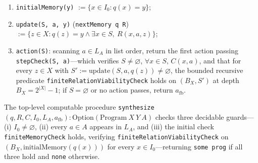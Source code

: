 \documentclass[11pt,a4paper]{article}
\newcounter{none}
\providecommand{\tightlist}{\setlength{\itemsep}{2pt}\setlength{\parskip}{0pt}}
\begin{document}
\begin{enumerate}
\def\labelenumi{\arabic{enumi}.}
\tightlist
\item
  \texttt{initialMemory(y)} \(:= \{x \in I_0 : q(x) = y\}\);
\item
  \texttt{update(S,\ a,\ y)} (\texttt{nextMemory\ q\ R})
  \(:= \{z \in X : q(z) = y \land \exists x \in S,\ R(x,a,z)\}\);
\item
  \texttt{action(S)}: scanning \(a \in L_A\) in list order, return the
  first action passing \texttt{stepCheck(S,\ a)}---which verifies
  \(S \neq \varnothing\), \(\forall x \in S,\, C(x,a)\), and that for
  every \(z \in X\) with
  \(S' := \mathrm{update}(S, a, q(z)) \neq \varnothing\), the bounded
  recursive predicate \texttt{finiteRelationViabilityCheck} holds on
  \((B_X, S')\) at depth \(B_X = 2^{|X|} - 1\); if \(S = \varnothing\)
  or no action passes, return \(a_{\mathrm{fb}}\).
\end{enumerate}

The top-level computable procedure
\texttt{synthesize}\((q, R, C, I_0, L_A, a_{\mathrm{fb}}) : \mathrm{Option}(\mathrm{Program}\ X\ Y\ A)\)
checks three decidable guards---(i) \(I_0 \neq \varnothing\), (ii) every
\(a \in A\) appears in \(L_A\), and (iii) the initial check
\texttt{finiteMemoryCheck} holds, verifying
\texttt{finiteRelationViabilityCheck} on
\((B_X, \mathrm{initialMemory}(q(x)))\) for every
\(x \in I_0\)---returning \texttt{some\ prog} if all three hold and
\texttt{none} otherwise.

\end{document}
